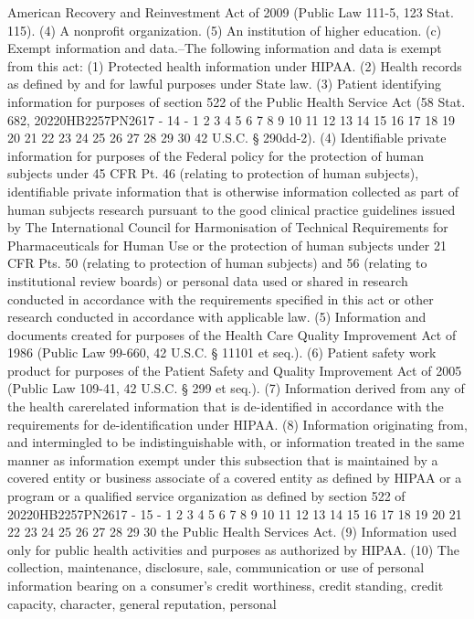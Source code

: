 American Recovery and Reinvestment Act of 2009 (Public Law
111-5, 123 Stat. 115).
(4) A nonprofit organization.
(5) An institution of higher education.
(c) Exempt information and data.--The following information
and data is exempt from this act:
(1) Protected health information under HIPAA.
(2) Health records as defined by and for lawful purposes
under State law.
(3) Patient identifying information for purposes of
section 522 of the Public Health Service Act (58 Stat. 682,
20220HB2257PN2617 - 14 -
1
2
3
4
5
6
7
8
9
10
11
12
13
14
15
16
17
18
19
20
21
22
23
24
25
26
27
28
29
30
42 U.S.C. § 290dd-2).
(4) Identifiable private information for purposes of the
Federal policy for the protection of human subjects under 45
CFR Pt. 46 (relating to protection of human subjects),
identifiable private information that is otherwise
information collected as part of human subjects research
pursuant to the good clinical practice guidelines issued by
The International Council for Harmonisation of Technical
Requirements for Pharmaceuticals for Human Use or the
protection of human subjects under 21 CFR Pts. 50 (relating
to protection of human subjects) and 56 (relating to
institutional review boards) or personal data used or shared
in research conducted in accordance with the requirements
specified in this act or other research conducted in
accordance with applicable law.
(5) Information and documents created for purposes of
the Health Care Quality Improvement Act of 1986 (Public Law
99-660, 42 U.S.C. § 11101 et seq.).
(6) Patient safety work product for purposes of the
Patient Safety and Quality Improvement Act of 2005 (Public
Law 109-41, 42 U.S.C. § 299 et seq.).
(7) Information derived from any of the health carerelated information that is de-identified in accordance with
the requirements for de-identification under HIPAA.
(8) Information originating from, and intermingled to be
indistinguishable with, or information treated in the same
manner as information exempt under this subsection that is
maintained by a covered entity or business associate of a
covered entity as defined by HIPAA or a program or a
qualified service organization as defined by section 522 of
20220HB2257PN2617 - 15 -
1
2
3
4
5
6
7
8
9
10
11
12
13
14
15
16
17
18
19
20
21
22
23
24
25
26
27
28
29
30
the Public Health Services Act.
(9) Information used only for public health activities
and purposes as authorized by HIPAA.
(10) The collection, maintenance, disclosure, sale,
communication or use of personal information bearing on a
consumer's credit worthiness, credit standing, credit
capacity, character, general reputation, personal
